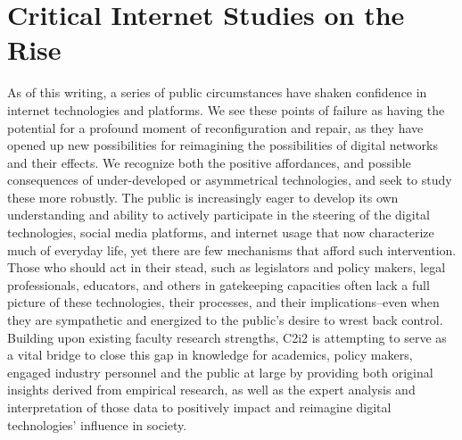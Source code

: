 \documentclass[11pt]{article}
\begin{document}
\section{Critical Internet Studies on the Rise}

As of this writing, a series of public circumstances have shaken confidence in internet technologies and platforms. We see these points of failure as having the potential for a profound moment of reconfiguration and repair, as they have opened up new possibilities for reimagining the possibilities of digital networks and their effects. We recognize both the positive affordances, and possible consequences of under-developed or asymmetrical technologies, and seek to study these more robustly. The public is increasingly eager to develop its own understanding and ability to actively participate in the steering of the digital technologies, social media platforms, and internet usage that now characterize much of everyday life, yet there are few mechanisms that afford such intervention. Those who should act in their stead, such as legislators and policy makers, legal professionals, educators, and others in gatekeeping capacities often lack a full picture of these technologies, their processes, and their implications--even when they are sympathetic and energized to the public’s desire to wrest back control. Building upon existing faculty research strengths, C2i2 is attempting to serve as a vital bridge to close this gap in knowledge for academics, policy makers, engaged industry personnel and the public at large by providing both original insights derived from empirical research, as well as the expert analysis and interpretation of those data to positively impact and reimagine digital technologies’ influence in society.
\end{document}
